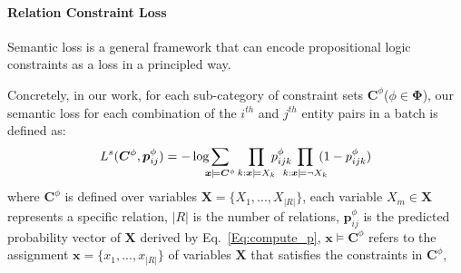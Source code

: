 \paragraph{Relation Constraint Loss}
Semantic loss is a general framework that can encode propositional logic constraints as a loss in a principled way.

Concretely, in our work, for each sub-category of constraint sets $\bm{C}^{\phi}$($\phi \in \bm{\Phi}$), our semantic loss for each combination of the $i^{th}$ and $j^{th}$ entity pairs in a batch is defined as:
\begin{equation}
\label{seq:semantic_loss}
	L^{s}(\bm{C}^{\phi}, \bm{p}^{\phi}_{ij}) = -\log\hspace{-0.5em}\sum\limits_{\bm x\models\bm{C}^{\phi}}\prod\limits_{k:\bm x\models X_k}\hspace{-0.5em}p^{\phi}_{ijk}\hspace{-0.9em}\prod\limits_{k:\bm x\models \neg X_k}\hspace{-0.7em}(1-p^{\phi}_{ijk})
\end{equation}
where $\bm{C}^{\phi}$ is defined over variables $\bm{X}=\{X_1,...,X_{|R|}\}$,
each variable $X_m \in \bm{X}$ represents a specific relation,
$|R|$ is the number of relations,
$\bm{p}^{\phi}_{ij}$ is the predicted probability vector of $\bm{X}$ derived by Eq.~\ref{Eq:compute_p},
$\bm x \models \bm{C}^{\phi}$ refers to the assignment $\bm{x} = \{x_1,...,x_{|R|}\}$ of variables $\bm X$ that satisfies the constraints in $\bm{C}^{\phi}$,
